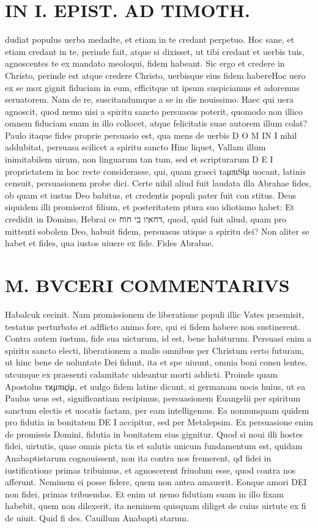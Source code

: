 \documentclass{article}
\begin{document}
\begin{pages}
\section*{IN I. EPIST. AD TIMOTH. }\pstart dudiat populus uerba medadte, et etiam in te credant perpetuo. Hoc sane, et etiam credant in te, perinde fait, atque si dixisset, ut tibi credant et uerbis tuis, agnoscentes te ex mandato meoloqui, fidem habeant. Sic ergo et credere in Christo, perinde est atque credere Christo, uerbisque eius fidem habere\pend\pstart Hoc uero ex se mox gignit fiduciam in eum, efficitque ut ipsum suspiciamus et adoremus seruatorem. Nam de re, suscitandumque a se in die nouissimo. Haec qui uera agnoscit, quod nemo nisi a spiritu sancto persuasus poterit, quomodo non illico omnem fiduciam suam in illo collocet, atque felicitatis suae autorem illum colat? Paulo itaque fides proprie persuasio est, qua mens de uerbis D O M IN I nihil addubitat, persuasa scilicet a spiritu sancto Hinc liquet, Vallam illum inimitabilem uirum, non linguarum tan tum, sed et scripturarum D E I proprictatem in hoc recte considerasse, qui, quam graeci τaμπιSίμ uocant, latinis censuit, persuasionem probe dici.  \pend\pstart Certe nihil aliud fuit laudata illa Abrahae fides, ob quam et iustus Deo babitus, et credentis populi pater fuit con stitus.  Deus siquidem illi promiserat filium, et posteritatem ptura suo idiotismo habet: Et credidit in Domino, Hebrai ce דחאיו בי חוח, quod, quid fuit aliud, quam pro mittenti sobolem Deo, habuit fidem, persuasus utique a spiritu dei? Non aliter se habet et fides, qua iustos uiuere  \pendFidutia ex fide.  Fides Abrabae.  
\section*{M. BVCERI COMMENTARIVS }
\marginpar{[ p.20 ]}\pstart Habalcuk cecinit.  Nam promissionem de liberatione populi illic Vates praemisit, testatus perturbato et adflicto animo fore, qui ei fidem habere non sustinerent. Contra autem iustum, fide sua uicturum, id est, bene habiturum.  Persuasi enim a spiritu sancto electi, liberationem a malis omnibus per Christum certo futuram, ut hinc bene de uoluntate Dei fidunt, ita et spe uiuunt, omnia boni consu lentes, utcunque ex praesenti calamitatc uideantur morti addicti.   \pend\pstart Proinde quam Apostolus τϰμπιςίμ, et uulgo fidem latine dicunt, si germanam uocis huius, ut ea Paulus usus est, significantiam recipimus, persuasionem Euangelii per spiritum sanctum electis et uocatis factam, per eam intelligemus. Ea nonnunquam quidem pro fidutia in bonitatem DE I accipitur, sed per Metalepsim.  Ex persuasione enim de promissis Domini, fidutia in bonitatem eius gignitur.  \pend\pstart Quod si noui illi hostes fidei, uirtutis, quae omnis picta tis et salutis unicum fundamentum est, quidam Anabaptistarum cognouissent, non ita contra nos fremerent, qđ fidei in iustificationc primas tribuimus, et agnoscerent friuolum esse, quod contra nos afferunt.  Neminem ei posse fidere, quem non antea amauerit.  Eonque amori DEI non fidei, primas tribuendas.  Et enim ut nemo fidutiam suam in illo fixam habebit, quem non dilexerit, ita neminem quisquam diliget de cuius uirtute  \pendIustus ex fi de uiuit.  Quid fi des.  Cauillum Anabapti starum.  

\end{pages}
\end{document}
